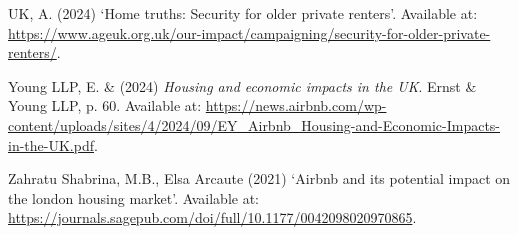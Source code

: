 \documentclass[
  a4paper,
  DIV=11,
  numbers=noendperiod]{scrartcl}
\newlength{\cslhangindent}
\newenvironment{CSLReferences}[2] %
 {\begin{list}{}{%
  \setlength{\itemindent}{0pt}
  \setlength{\leftmargin}{0pt}
  \setlength{\parsep}{0pt}
  \ifodd #1
   \setlength{\leftmargin}{\cslhangindent}
   \setlength{\itemindent}{-1\cslhangindent}
  \fi
  \setlength{\itemsep}{#2\baselineskip}}}
 {\end{list}}
\begin{document}
\begin{CSLReferences}{0}{1}
UK, A. (2024) {`Home truths: Security for older private renters'}.
Available at:
\url{https://www.ageuk.org.uk/our-impact/campaigning/security-for-older-private-renters/}.

Young LLP, E. \& (2024) \emph{Housing and economic impacts in the UK}.
Ernst \& Young LLP, p. 60. Available at:
\url{https://news.airbnb.com/wp-content/uploads/sites/4/2024/09/EY_Airbnb_Housing-and-Economic-Impacts-in-the-UK.pdf}.

Zahratu Shabrina, M.B., Elsa Arcaute (2021) {`Airbnb and its potential
impact on the london housing market'}. Available at:
\url{https://journals.sagepub.com/doi/full/10.1177/0042098020970865}.

\end{CSLReferences}
\end{document}
